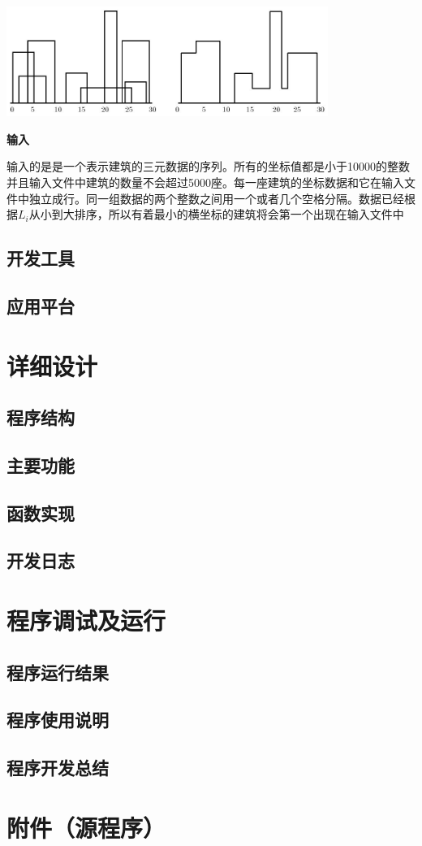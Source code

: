 \documentclass[a4paper]{ctexart}
\begin{document}
	\includegraphics[width=10.465cm,height=3.577cm]{effect.jpg}

	\textbf{输入}
	
	输入的是是一个表示建筑的三元数据的序列。所有的坐标值都是小于10000的整数并且输入文件中建筑的数量不会超过5000座。每一座建筑的坐标数据和它在输入文件中独立成行。同一组数据的两个整数之间用一个或者几个空格分隔。数据已经根据$L_i$从小到大排序，所以有着最小的横坐标的建筑将会第一个出现在输入文件中



	\subsection{开发工具}
	\subsection{应用平台}
	\section{详细设计}
	\subsection{程序结构}
	\subsection{主要功能}
	\subsection{函数实现}
	\subsection{开发日志}
	\section{程序调试及运行}
	\subsection{程序运行结果}
	\subsection{程序使用说明}
	\subsection{程序开发总结}
	\section{附件（源程序）}
\end{document}
